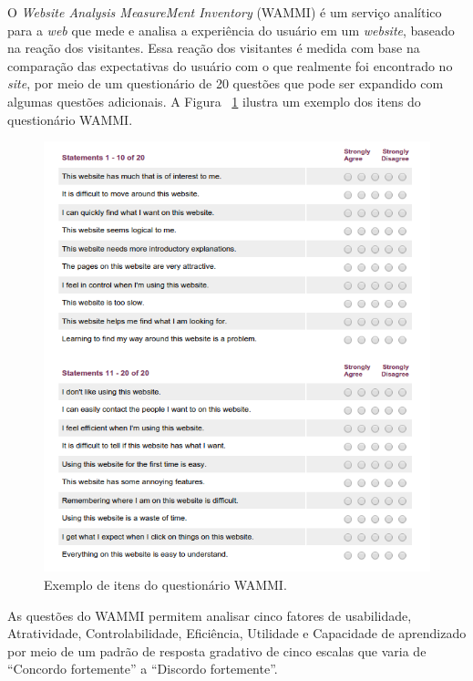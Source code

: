       O \textit{Website Analysis MeasureMent Inventory} (WAMMI) é um serviço analítico para a \textit{web} que mede e analisa a experiência do
      usuário em um \textit{website}, baseado na reação dos visitantes. Essa reação dos visitantes é medida com base na comparação das
      expectativas do usuário com o que realmente foi encontrado no \textit{site}, por meio de um questionário de 20 questões que pode
      ser expandido com algumas questões adicionais. A Figura ~\ref{wammi_questions} ilustra um exemplo dos itens do questionário WAMMI.
      
      \begin{figure}[!htpb]
	\centering
	\includegraphics[scale=0.67]{editaveis/figuras/wammi_questions}
	\caption[Exemplo de itens do questionário WAMMI]{Exemplo de itens do questionário WAMMI. \footnotemark}
	\label{wammi_questions}
      \end{figure}
      
      As questões do WAMMI permitem analisar cinco fatores de usabilidade, Atratividade, Controlabilidade, Eficiência, Utilidade
      e Capacidade de aprendizado por meio de um padrão de resposta gradativo de cinco escalas que varia de “Concordo fortemente”
      a “Discordo fortemente”.
      
